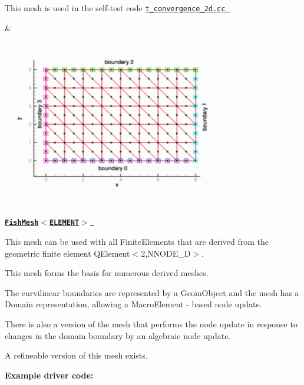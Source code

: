\begin{center}
\begin{longtabu}
\begin{DoxyItemize}
\item This mesh is used in the self-\/test code \href{../../../../self_test/poisson/convergence_tests/t_convergence_2d.cc}{\tt {\ttfamily t\+\_\+convergence\+\_\+2d.\+cc} }
\end{DoxyItemize}& 
\begin{DoxyImageNoCaption}
  \mbox{\includegraphics[width=0.75\textwidth]{simple_rectangular_trimesh}}
\end{DoxyImageNoCaption}
   \\
\href{classoomph_1_1FishMesh.html}{\tt {\bfseries  Fish\+Mesh$<$\+E\+L\+E\+M\+E\+N\+T$>$ }} ~\newline
~\newline

\begin{DoxyItemize}
\item This mesh can be used with all {\ttfamily Finite\+Elements} that are derived from the geometric finite element {\ttfamily Q\+Element$<$2,\+N\+N\+O\+D\+E\+\_\+D$>$}.
\item This mesh forms the basis for numerous derived meshes.
\item The curvilinear boundaries are represented by a {\ttfamily Geom\+Object} and the mesh has a {\ttfamily Domain} representation, allowing a {\ttfamily Macro\+Element} -\/ based node update.
\item There is also a version of the mesh that performs the node update in response to changes in the domain boundary by an algebraic node update.
\item A refineable version of this mesh exists.
\end{DoxyItemize}{\bfseries Example driver code\+:} ~\newline


\end{longtabu}
\end{center}
